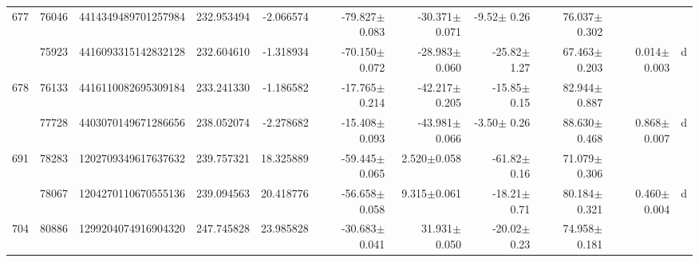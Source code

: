 \documentclass{ws-ijmpd}
\begin{document}
\begin{landscape}
\begin{longtable}{rrrrrrrrrrl}
 \hline 677 &   76046 &      4414349489701257984 &                   232.953494 &                    -2.066574 &                -79.827$\pm$0.083 &                -30.371$\pm$0.071 &          -9.52$\pm$  0.26 &        76.037$\pm$0.302 &                                           &                                                    \\
            &   75923 &      4416093315142832128 &                   232.604610 &                    -1.318934 &                -70.150$\pm$0.072 &                -28.983$\pm$0.060 &         -25.82$\pm$  1.27 &        67.463$\pm$0.203 &                           0.014$\pm$0.003 &                                                  d \\
 \hline 678 &   76133 &      4416110082695309184 &                   233.241330 &                    -1.186582 &                -17.765$\pm$0.214 &                -42.217$\pm$0.205 &         -15.85$\pm$  0.15 &        82.944$\pm$0.887 &                                           &                                                    \\
            &   77728 &      4403070149671286656 &                   238.052074 &                    -2.278682 &                -15.408$\pm$0.093 &                -43.981$\pm$0.066 &          -3.50$\pm$  0.26 &        88.630$\pm$0.468 &                           0.868$\pm$0.007 &                                                  d \\
 \hline 691 &   78283 &      1202709349617637632 &                   239.757321 &                    18.325889 &                -59.445$\pm$0.065 &                  2.520$\pm$0.058 &         -61.82$\pm$  0.16 &        71.079$\pm$0.306 &                                           &                                                    \\
            &   78067 &      1204270110670555136 &                   239.094563 &                    20.418776 &                -56.658$\pm$0.058 &                  9.315$\pm$0.061 &         -18.21$\pm$  0.71 &        80.184$\pm$0.321 &                           0.460$\pm$0.004 &                                                  d \\
 \hline 704 &   80886 &      1299204074916904320 &                   247.745828 &                    23.985828 &                -30.683$\pm$0.041 &                 31.931$\pm$0.050 &         -20.02$\pm$  0.23 &        74.958$\pm$0.181 &                                           &                                                    \\

\end{longtable}
\end{landscape}
\end{document}
